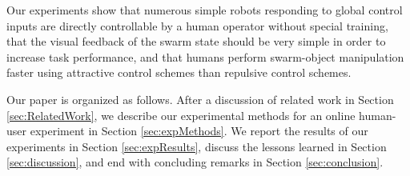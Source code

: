 Our experiments show that numerous simple robots responding to global control inputs are directly controllable by a human operator without special training, that the visual feedback of the swarm state should be very simple in order to increase task performance, and that humans perform swarm-object manipulation faster using attractive control schemes than repulsive control schemes.



 Our paper is organized as follows.  After a discussion of related work in Section \ref{sec:RelatedWork}, we describe our experimental methods for an online human-user experiment in Section \ref{sec:expMethods}.  We report the results of our experiments in Section \ref{sec:expResults}, discuss the lessons learned in Section \ref{sec:discussion}, and end with concluding remarks in Section \ref{sec:conclusion}.


